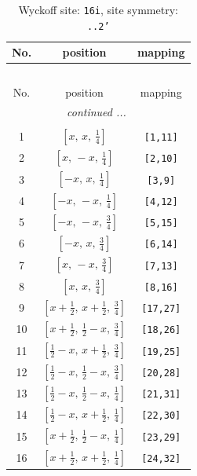 \documentclass[fleqn,8pt]{jsarticle}
\begin{document}
\begin{longtable}{ccc}
\caption{Wyckoff site: {\tt 16i}, site symmetry: {\tt ..2'}}
 \\
 \hline \hline
No. & position & mapping \\ \hline \endfirsthead

\multicolumn{2}{l}{\tablename\ \thetable{}} \\
 \hline \hline
No. & position & mapping \\ \hline \endhead

 \hline \hline
\multicolumn{2}{r}{\footnotesize\it continued ...} \\ \endfoot

 \hline \hline
\multicolumn{2}{r}{} \\ \endlastfoot

1 & $\left[ x,\, x,\, \frac{1}{4} \right]$ & {\tt [1,11]} \\ \hline
2 & $\left[ x,\, - x,\, \frac{1}{4} \right]$ & {\tt [2,10]} \\ \hline
3 & $\left[ - x,\, x,\, \frac{1}{4} \right]$ & {\tt [3,9]} \\ \hline
4 & $\left[ - x,\, - x,\, \frac{1}{4} \right]$ & {\tt [4,12]} \\ \hline
5 & $\left[ - x,\, - x,\, \frac{3}{4} \right]$ & {\tt [5,15]} \\ \hline
6 & $\left[ - x,\, x,\, \frac{3}{4} \right]$ & {\tt [6,14]} \\ \hline
7 & $\left[ x,\, - x,\, \frac{3}{4} \right]$ & {\tt [7,13]} \\ \hline
8 & $\left[ x,\, x,\, \frac{3}{4} \right]$ & {\tt [8,16]} \\ \hline
9 & $\left[ x + \frac{1}{2},\, x + \frac{1}{2},\, \frac{3}{4} \right]$ & {\tt [17,27]} \\ \hline
10 & $\left[ x + \frac{1}{2},\, \frac{1}{2} - x,\, \frac{3}{4} \right]$ & {\tt [18,26]} \\ \hline
11 & $\left[ \frac{1}{2} - x,\, x + \frac{1}{2},\, \frac{3}{4} \right]$ & {\tt [19,25]} \\ \hline
12 & $\left[ \frac{1}{2} - x,\, \frac{1}{2} - x,\, \frac{3}{4} \right]$ & {\tt [20,28]} \\ \hline
13 & $\left[ \frac{1}{2} - x,\, \frac{1}{2} - x,\, \frac{1}{4} \right]$ & {\tt [21,31]} \\ \hline
14 & $\left[ \frac{1}{2} - x,\, x + \frac{1}{2},\, \frac{1}{4} \right]$ & {\tt [22,30]} \\ \hline
15 & $\left[ x + \frac{1}{2},\, \frac{1}{2} - x,\, \frac{1}{4} \right]$ & {\tt [23,29]} \\ \hline
16 & $\left[ x + \frac{1}{2},\, x + \frac{1}{2},\, \frac{1}{4} \right]$ & {\tt [24,32]} \\
\end{longtable}
\end{document}
